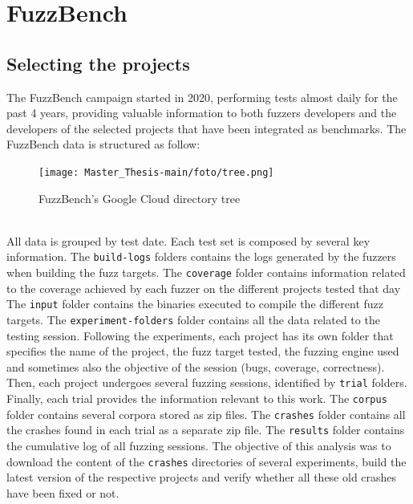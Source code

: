 \newpage
\section{FuzzBench}
\subsection{Selecting the projects}
The FuzzBench campaign started in 2020, performing tests almost daily for the past 4 years, providing valuable information to both fuzzers developers and the developers of the selected projects that have been integrated as benchmarks.
\newline \newline
The FuzzBench data is structured as follow:
\begin{figure}[h]
\centering
\texttt{[image: Master\_Thesis-main/foto/tree.png]}
\caption{FuzzBench's Google Cloud directory tree}
\label{fig:tree}
\end{figure}
\ \\
All data is grouped by test date.
\newline \newline
Each test set is composed by several key information.
\newline 
The \verb|build-logs| folders contains the logs generated by the fuzzers when building the fuzz targets.
\newline 
The \verb|coverage| folder contains information related to the coverage achieved by each fuzzer on the different projects tested that day
\newline
The \verb|input| folder contains the binaries executed to compile the different fuzz targets.
\newline
The \verb|experiment-folders| folder contains all the data related to the testing session.
\newline \newline
Following the experiments, each project has its own folder that specifies the name of the project, the fuzz target tested, the fuzzing engine used and sometimes also the objective of the session (bugs, coverage, correctness). 
\newline
Then, each project undergoes several fuzzing sessions, identified by \verb|trial| folders.
\newline \newline
Finally, each trial provides the information relevant to this work.
\newline
The \verb|corpus| folder contains several corpora stored as zip files.
\newline
The \verb|crashes| folder contains all the crashes found in each trial as a separate zip file.
\newline
The \verb|results| folder contains the cumulative log of all fuzzing sessions.
\newline \newline
The objective of this analysis was to download the content of the \verb|crashes| directories of several experiments, build the latest version of the respective projects and verify whether all these old crashes have been fixed or not.



